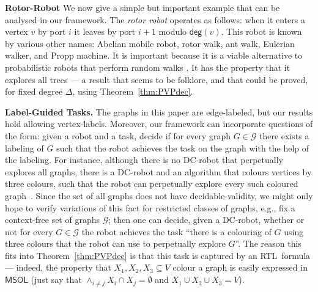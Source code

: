 \documentclass{aamas2015}
\def\RTL{\textsf{RTL}}
\def\gclass{\mathcal{G}}
\def\deg{\textsf{deg}}
\def\msol{\mathsf{MSOL}}
\newcommand{\sr}[1]{\footnote{{\color{red} Note. #1}}}
\begin{document}
{\bf Rotor-Robot} We now give a simple but important example that can be analysed in our framework. The {\em rotor robot} operates as follows: when it enters a vertex $v$ by port $i$ it leaves by port $i+1$ modulo $\deg(v)$. This robot is known by various other names: Abelian mobile robot, rotor walk, ant walk, Eulerian walker, and Propp machine. It is important because it is a viable alternative to probabilistic robots that perform random walks \cite{BL13}. It has the property that it explores all trees --- a result that seems to be folklore, and that could be proved, for fixed degree $\Delta$, using Theorem~\ref{thm:PVPdec}.

{\bf Label-Guided Tasks.}
The graphs in this paper are edge-labeled, but our results hold allowing vertex-labels. Moreover, our framework can incorporate questions of the form: given a robot and a task, decide if for every graph $G \in \gclass$ there exists a labeling of $G$ such that the robot achieves the task on the graph with the help of the labeling. For instance, although there is no DC-robot that perpetually explores all graphs, there is a DC-robot and an algorithm that colours vertices by three colours, such that the robot can perpetually explore every such coloured graph~\cite{Cohen05graphexploration}. Since the set of all graphs does not have decidable-validity, we might only hope to verify variations of this fact for restricted classes of graphs, e.g., fix a context-free set of graphs $\gclass$; then one can decide, given a DC-robot, whether or not for every $G \in \gclass$ the robot achieves the task ``there is a colouring of $G$ using three colours that the robot can use to perpetually explore $G$''. The reason this fits into Theorem~\ref{thm:PVPdec} is that this task is captured by an \RTL\ formula --- indeed, the property that $X_1,X_2,X_3 \subseteq V$ colour a graph is easily expressed in $\msol$ (just say that $\wedge_{i\neq j} X_i \cap X_j = \emptyset$ and $X_1 \cup X_2 \cup X_3 = V$).


\end{document}
